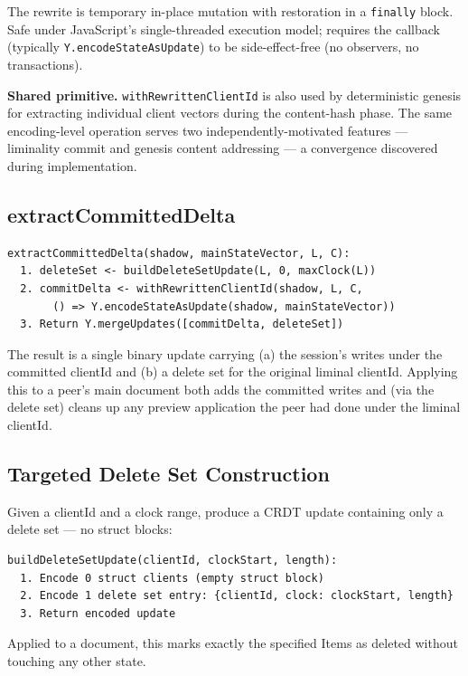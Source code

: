 The rewrite is temporary in-place mutation with restoration in a \texttt{finally} block. Safe under JavaScript's single-threaded execution model; requires the callback (typically \texttt{Y.encodeStateAsUpdate}) to be side-effect-free (no observers, no transactions).

\textbf{Shared primitive.} \texttt{withRewrittenClientId} is also used by deterministic genesis \cite{plexus:genesis} for extracting individual client vectors during the content-hash phase. The same encoding-level operation serves two independently-motivated features --- liminality commit and genesis content addressing --- a convergence discovered during implementation.

\subsection{extractCommittedDelta}

\begin{lstlisting}
extractCommittedDelta(shadow, mainStateVector, L, C):
  1. deleteSet <- buildDeleteSetUpdate(L, 0, maxClock(L))
  2. commitDelta <- withRewrittenClientId(shadow, L, C,
       () => Y.encodeStateAsUpdate(shadow, mainStateVector))
  3. Return Y.mergeUpdates([commitDelta, deleteSet])
\end{lstlisting}

The result is a single binary update carrying (a) the session's writes under the committed clientId and (b) a delete set for the original liminal clientId. Applying this to a peer's main document both adds the committed writes and (via the delete set) cleans up any preview application the peer had done under the liminal clientId.

\subsection{Targeted Delete Set Construction}

Given a clientId and a clock range, produce a CRDT update containing only a delete set --- no struct blocks:

\begin{lstlisting}
buildDeleteSetUpdate(clientId, clockStart, length):
  1. Encode 0 struct clients (empty struct block)
  2. Encode 1 delete set entry: {clientId, clock: clockStart, length}
  3. Return encoded update
\end{lstlisting}

Applied to a document, this marks exactly the specified Items as deleted without touching any other state.

